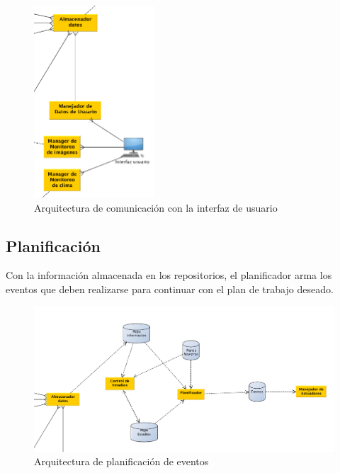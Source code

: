 \begin{figure}[h!]
  \centering
  \includegraphics[width=0.4\textwidth]{./images/arq_interfazusuario.png}
  \caption{Arquitectura de comunicaci\'on con la interfaz de usuario}
  \label{fig:clases4}
\end{figure}

\subsection{Planificaci\'on}

Con la informaci\'on almacenada en los repositorios, el planificador arma los eventos que deben realizarse para continuar con el plan de trabajo deseado.

\begin{figure}[h!]
  \centering
  \includegraphics[width=1\textwidth]{./images/arq_plan.png}
  \caption{Arquitectura de planificaci\'on de eventos}
  \label{fig:clases4}
\end{figure}
